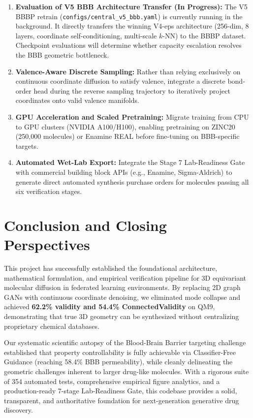 \documentclass[12pt, a4paper]{article}
\begin{document}
\begin{enumerate}[leftmargin=*]
    \item \textbf{Evaluation of V5 BBB Architecture Transfer (In Progress):} The V5 BBBP retrain (\texttt{configs/central\_v5\_bbb.yaml}) is currently running in the background. It directly transfers the winning V4-eps architecture (256-dim, 8 layers, coordinate self-conditioning, multi-scale $k$-NN) to the BBBP dataset. Checkpoint evaluations will determine whether capacity escalation resolves the BBB geometric bottleneck.
    \item \textbf{Valence-Aware Discrete Sampling:} Rather than relying exclusively on continuous coordinate diffusion to satisfy valence, integrate a discrete bond-order head during the reverse sampling trajectory to iteratively project coordinates onto valid valence manifolds.
    \item \textbf{GPU Acceleration and Scaled Pretraining:} Migrate training from CPU to GPU clusters (NVIDIA A100/H100), enabling pretraining on ZINC20 (250,000 molecules) or Enamine REAL before fine-tuning on BBB-specific targets.
    \item \textbf{Automated Wet-Lab Export:} Integrate the Stage 7 Lab-Readiness Gate with commercial building block APIs (e.g., Enamine, Sigma-Aldrich) to generate direct automated synthesis purchase orders for molecules passing all six verification stages.
\end{enumerate}

\section{Conclusion and Closing Perspectives}

This project has successfully established the foundational architecture, mathematical formulation, and empirical verification pipeline for 3D equivariant molecular diffusion in federated learning environments. By replacing 2D graph GANs with continuous coordinate denoising, we eliminated mode collapse and achieved \textbf{62.2\% validity and 54.4\% ConnectedValidity} on QM9, demonstrating that true 3D geometry can be synthesized without centralizing proprietary chemical databases.

Our systematic scientific autopsy of the Blood-Brain Barrier targeting challenge established that property controllability is fully achievable via Classifier-Free Guidance (reaching 58.4\% BBB permeability), while cleanly delineating the geometric challenges inherent to larger drug-like molecules. With a rigorous suite of 354 automated tests, comprehensive empirical figure analytics, and a production-ready 7-stage Lab-Readiness Gate, this codebase provides a solid, transparent, and authoritative foundation for next-generation generative drug discovery.
\end{document}
